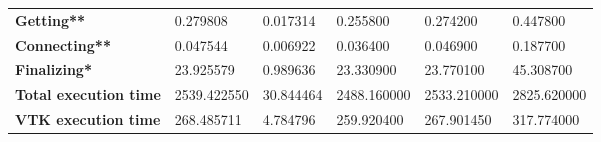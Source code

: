 \begin{table}[t]
\begin{subtable}{\textwidth}
{\begin{tabular}{llllll}
    \textbf{Getting**}            & 0.279808    & 0.017314  & 0.255800    & 0.274200    & 0.447800    \\
    \textbf{Connecting**}         & 0.047544    & 0.006922  & 0.036400    & 0.046900    & 0.187700    \\
    \textbf{Finalizing*}          & 23.925579   & 0.989636  & 23.330900   & 23.770100   & 45.308700   \\ \hline
    \textbf{Total execution time} & 2539.422550 & 30.844464 & 2488.160000 & 2533.210000 & 2825.620000 \\ \hline
    \textbf{VTK execution time}   & 268.485711  & 4.784796  & 259.920400  & 267.901450  & 317.774000 
    \end{tabular}}
  \end{subtable}
\end{table}


